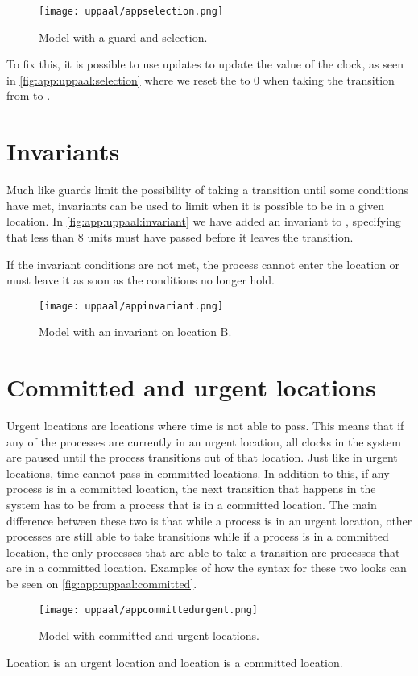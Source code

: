 \begin{figure}[H]
    \centering
    \texttt{[image: uppaal/appselection.png]}
    \caption{Model with a guard and selection.}
    \label{fig:app:uppaal:selection}
\end{figure}
\noindent
To fix this, it is possible to use updates to update the value of the clock, as seen in \autoref{fig:app:uppaal:selection} where we reset the  to 0 when taking the transition from  to .

\section*{Invariants}
Much like guards limit the possibility of taking a transition until some conditions have met, invariants can be used to limit when it is possible to be in a given location.
In \autoref{fig:app:uppaal:invariant} we have added an invariant to , specifying that less than 8  units must have passed before it leaves the transition.

If the invariant conditions are not met, the process cannot enter the location or must leave it as soon as the conditions no longer hold.
\begin{figure}[H]
    \centering
    \texttt{[image: uppaal/appinvariant.png]}
    \caption{Model with an invariant on location B.}
    \label{fig:app:uppaal:invariant}
\end{figure}

\section*{Committed and urgent locations}
Urgent locations are locations where time is not able to pass.
This means that if any of the processes are currently in an urgent location, all clocks in the system are paused until the process transitions out of that location.
Just like in urgent locations, time cannot pass in committed locations.
In addition to this, if any process is in a committed location, the next transition that happens in the system has to be from a process that is in a committed location. 
The main difference between these two is that while a process is in an urgent location, other processes are still able to take transitions while if a process is in a committed location, the only processes that are able to take a transition are processes that are in a committed location.
Examples of how the syntax for these two looks can be seen on \autoref{fig:app:uppaal:committed}.

\begin{figure}[H]
    \centering
    \texttt{[image: uppaal/appcommittedurgent.png]}
    \caption{Model with committed and urgent locations.}
    \label{fig:app:uppaal:committed}
\end{figure}
\noindent

Location  is an urgent location and location  is a committed location.

